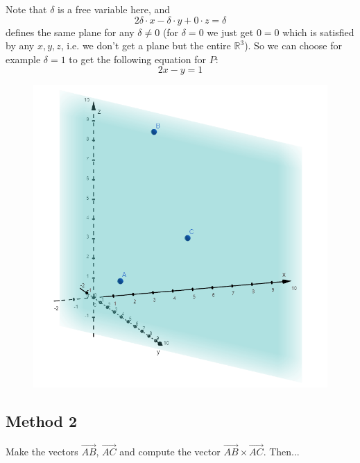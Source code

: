 \documentclass[a4paper,10pt]{article}
\begin{document}
Note that $\delta$ is a free variable here, and
\[
    2\delta \cdot x -\delta \cdot y + 0\cdot z = \delta
\]
defines the same plane for any $\delta \neq 0$ (for $\delta=0$ we just get $0=0$ which is satisfied by any $x,y,z$, i.e. we don't get a plane but the entire $\mathbb{R}^3$). So we can choose for example $\delta =1$ to get the following equation for $P$:
\[
    2x - y = 1
\]

\begin{figure}[!ht]
    \centering
    \includegraphics[scale=0.5]{ex_6.png}
\end{figure}

\subsection{Method 2}
Make the vectors $\overrightarrow{AB}$, $\overrightarrow{AC}$ and compute the vector $\overrightarrow{AB} \times \overrightarrow{AC}$. Then...
\end{document}

